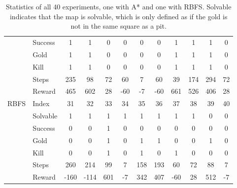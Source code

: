 \begin{table}[!h]
{\begin{tabular}{|l|l|c|c|c|c|c|c|c|c|c|c|}
		 & Success & 1 & 1 & 0 & 0 & 0 & 0 & 1 & 1 & 1 & 0 \\ \cline{2-12}
		 & Gold & 1 & 1 & 0 & 0 & 0 & 0 & 1 & 1 & 1 & 0 \\ \cline{2-12}
		 & Kill & 1 & 1 & 0 & 0 & 0 & 0 & 1 & 1 & 1 & 0 \\ \cline{2-12}
		 & Steps & 235 & 98 & 72 & 60 & 7 & 60 & 39 & 174 & 294 & 72 \\ \cline{2-12}
		 & Reward & 465 & 602 & 28 & -60 & -7 & -60 & 661 & 526 & 406 & 28 \\ \cline{2-12}
		\hline
		RBFS & Index & 31 & 32 & 33 & 34 & 35 & 36 & 37 & 38 & 39 & 40 \\ \cline{2-12}
		 & Solvable & 1 & 1 & 1 & 1 & 1 & 1 & 1 & 1 & 0 & 0 \\ \cline{2-12}
		 & Success & 0 & 0 & 1 & 0 & 0 & 0 & 0 & 0 & 0 & 0 \\ \cline{2-12}
		 & Gold & 0 & 0 & 1 & 0 & 1 & 1 & 0 & 0 & 1 & 0 \\ \cline{2-12}
		 & Kill & 0 & 0 & 1 & 0 & 1 & 0 & 1 & 0 & 0 & 0 \\ \cline{2-12}
		 & Steps & 260 & 214 & 99 & 7 & 158 & 193 & 60 & 72 & 88 & 7 \\ \cline{2-12}
		 & Reward & -160 & -114 & 601 & -7 & 342 & 407 & -60 & 28 & 512 & -7 \\ \cline{2-12}
		\hline
	    \end{tabular}
    }
    \caption{Statistics of all 40 experiments, one with A* and one with RBFS. Solvable indicates that the map is solvable, which is only defined as if the gold is not in the same square as a pit.}\label{tab:results}
\end{table}
